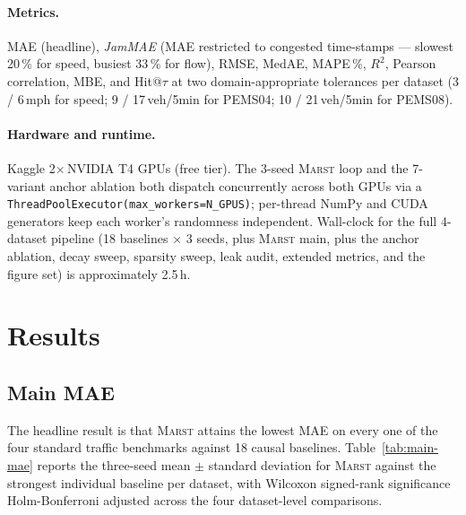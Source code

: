 \documentclass[11pt]{article}
\newcommand{\MARST}{\textsc{Marst}\xspace}
\begin{document}
\paragraph{Metrics.}  MAE (headline), \emph{JamMAE} (MAE restricted to
congested time-stamps --- slowest 20\,\% for speed, busiest 33\,\% for
flow), RMSE, MedAE, MAPE\,\%, $R^2$, Pearson correlation, MBE, and
Hit@$\tau$ at two domain-appropriate tolerances per dataset (3 / 6\,mph
for speed; 9 / 17\,veh/5min for PEMS04; 10 / 21\,veh/5min for PEMS08).

\paragraph{Hardware and runtime.}  Kaggle 2$\times$\,NVIDIA T4 GPUs
(free tier).  The 3-seed \MARST loop and the 7-variant anchor ablation
both dispatch concurrently across both GPUs via a
\texttt{ThreadPoolExecutor(max\_workers=N\_GPUS)}; per-thread NumPy and
CUDA generators keep each worker's randomness independent.  Wall-clock
for the full 4-dataset pipeline (18 baselines $\times$ 3 seeds, plus
\MARST main, plus the anchor ablation, decay sweep, sparsity sweep,
leak audit, extended metrics, and the figure set) is approximately
2.5\,h.

\section{Results}
\label{sec:results}

\subsection{Main MAE}
\label{sec:results-main}

The headline result is that \MARST attains the lowest MAE on every one
of the four standard traffic benchmarks against 18 causal baselines.
Table~\ref{tab:main-mae} reports the three-seed mean $\pm$ standard
deviation for \MARST against the strongest individual baseline per
dataset, with Wilcoxon signed-rank significance Holm-Bonferroni
adjusted across the four dataset-level comparisons.
\end{document}

